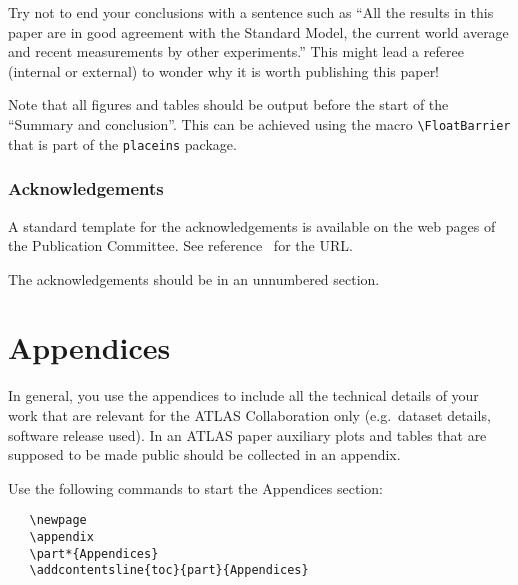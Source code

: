\documentclass[UKenglish]{latex/atlasdoc}
\newcommand{\Macro}[1]{\texttt{\textbackslash #1}\xspace}
\begin{document}
Try not to end your conclusions with a sentence such as
``All the results in this paper are in good agreement with the Standard Model,
the current world average and recent measurements by other experiments.'' 
This might lead a referee (internal or external) to wonder why it is worth publishing this paper!

Note that all figures and tables should be output before the start of the
``Summary and conclusion''.
This can be achieved using the macro \Macro{FloatBarrier} that is part of the 
\texttt{placeins} package.


\section*{Acknowledgements}
\label{sec:acknowldge}

A standard template for the acknowledgements is available on the
web pages of the Publication Committee.
See reference~\cite{publication-policy} for the URL. 

The acknowledgements should be in an unnumbered section.


\printbibliography
% 
% 


\newpage
\appendix
\part*{Appendices}

In general, you use the appendices to include all the technical details of your work
that are relevant for the ATLAS Collaboration only (e.g.\ dataset details, software release used).
In an ATLAS paper auxiliary plots and tables that are supposed to be made public 
should be collected in an appendix.

Use the following commands to start the Appendices section:
\begin{verbatim}
   \newpage
   \appendix
   \part*{Appendices}
   \addcontentsline{toc}{part}{Appendices}
\end{verbatim}
\end{document}
